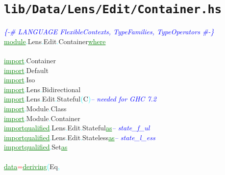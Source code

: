 \section{\texttt{lib/Data/Lens/Edit/Container.hs}}
\label{mod:Data.Lens.Edit.Container}
\textcolor{blue}{{\it{}\{-\# LANGUAGE FlexibleContexts, TypeFamilies, TypeOperators \#-\}}}\\\textcolor{green}{\underline{module}}\textcolor{cyan}{.}{\rm{}Lens}\textcolor{cyan}{.}{\rm{}Edit}\textcolor{cyan}{.}{\rm{}Container}\hsspace \textcolor{green}{\underline{where}}\\\\\textcolor{green}{\underline{import}}\textcolor{cyan}{.}{\rm{}Container}\\\textcolor{green}{\underline{import}}\textcolor{cyan}{.}{\rm{}Default}\\\textcolor{green}{\underline{import}}\textcolor{cyan}{.}{\rm{}Iso}\\\textcolor{green}{\underline{import}}\textcolor{cyan}{.}{\rm{}Lens}\textcolor{cyan}{.}{\rm{}Bidirectional}\\\textcolor{green}{\underline{import}}\textcolor{cyan}{.}{\rm{}Lens}\textcolor{cyan}{.}{\rm{}Edit}\textcolor{cyan}{.}{\rm{}Stateful}\hsspace \textcolor{cyan}{(}{\rm{}C}\textcolor{cyan}{)}\hsspace \textcolor{blue}{{\it{}-- needed for GHC 7.2}}\\\textcolor{green}{\underline{import}}\textcolor{cyan}{.}{\rm{}Module}\textcolor{cyan}{.}{\rm{}Class}\\\textcolor{green}{\underline{import}}\textcolor{cyan}{.}{\rm{}Module}\textcolor{cyan}{.}{\rm{}Container}\\\textcolor{green}{\underline{import}}\hsspace \textcolor{green}{\underline{qualified}}\textcolor{cyan}{.}{\rm{}Lens}\textcolor{cyan}{.}{\rm{}Edit}\textcolor{cyan}{.}{\rm{}Stateful}\hsspace \hsspace \textcolor{green}{\underline{as}}\hsspace \textcolor{blue}{{\it{}-- state\_f\_ul}}\\\textcolor{green}{\underline{import}}\hsspace \textcolor{green}{\underline{qualified}}\textcolor{cyan}{.}{\rm{}Lens}\textcolor{cyan}{.}{\rm{}Edit}\textcolor{cyan}{.}{\rm{}Stateless}\hsspace \textcolor{green}{\underline{as}}\hsspace \textcolor{blue}{{\it{}-- state\_l\_ess}}\\\textcolor{green}{\underline{import}}\hsspace \textcolor{green}{\underline{qualified}}\textcolor{cyan}{.}{\rm{}Set}\hsspace \hsspace \hsspace \hsspace \hsspace \hsspace \hsspace \hsspace \hsspace \hsspace \hsspace \hsspace \hsspace \hsspace \hsspace \hsspace \hsspace \textcolor{green}{\underline{as}}\\\\\textcolor{green}{\underline{data}}\hsspace \textcolor{red}{=}\hsspace \textcolor{green}{\underline{deriving}}\hsspace \textcolor{cyan}{(}{\rm{}Eq}\textcolor{cyan}{,}\hsspace 